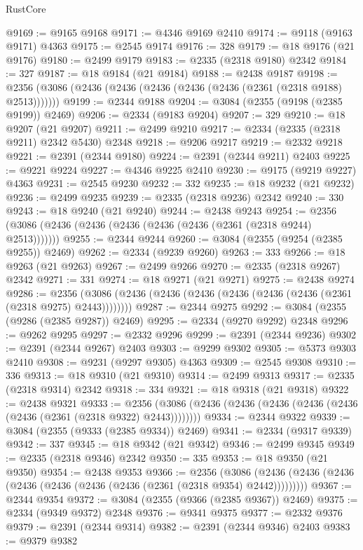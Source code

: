 \begin{lexlean}{RustCore}
\begin{coremodule}
@9169 := @9165 @9168
@9171 := @4346 @9169 @2410
@9174 := @9118 (@9163 @9171) @4363
@9175 := @2545 @9174
@9176 := 328
@9179 := @18 @9176 (@21 @9176)
@9180 := @2499 @9179
@9183 := @2335 (@2318 @9180) @2342
@9184 := 327
@9187 := @18 @9184 (@21 @9184)
@9188 := @2438 @9187
@9198 := @2356 (@3086 (@2436 (@2436 (@2436 (@2436 (@2436 (@2361 (@2318 @9188) @2513)))))))
@9199 := @2344 @9188
@9204 := @3084 (@2355 (@9198 (@2385 @9199)) @2469)
@9206 := @2334 (@9183 @9204)
@9207 := 329
@9210 := @18 @9207 (@21 @9207)
@9211 := @2499 @9210
@9217 := @2334 (@2335 (@2318 @9211) @2342 @5430) @2348
@9218 := @9206 @9217
@9219 := @2332 @9218
@9221 := @2391 (@2344 @9180)
@9224 := @2391 (@2344 @9211) @2403
@9225 := @9221 @9224
@9227 := @4346 @9225 @2410
@9230 := @9175 (@9219 @9227) @4363
@9231 := @2545 @9230
@9232 := 332
@9235 := @18 @9232 (@21 @9232)
@9236 := @2499 @9235
@9239 := @2335 (@2318 @9236) @2342
@9240 := 330
@9243 := @18 @9240 (@21 @9240)
@9244 := @2438 @9243
@9254 := @2356 (@3086 (@2436 (@2436 (@2436 (@2436 (@2436 (@2361 (@2318 @9244) @2513)))))))
@9255 := @2344 @9244
@9260 := @3084 (@2355 (@9254 (@2385 @9255)) @2469)
@9262 := @2334 (@9239 @9260)
@9263 := 333
@9266 := @18 @9263 (@21 @9263)
@9267 := @2499 @9266
@9270 := @2335 (@2318 @9267) @2342
@9271 := 331
@9274 := @18 @9271 (@21 @9271)
@9275 := @2438 @9274
@9286 := @2356 (@3086 (@2436 (@2436 (@2436 (@2436 (@2436 (@2436 (@2361 (@2318 @9275) @2443))))))))
@9287 := @2344 @9275
@9292 := @3084 (@2355 (@9286 (@2385 @9287)) @2469)
@9295 := @2334 (@9270 @9292) @2348
@9296 := @9262 @9295
@9297 := @2332 @9296
@9299 := @2391 (@2344 @9236)
@9302 := @2391 (@2344 @9267) @2403
@9303 := @9299 @9302
@9305 := @5373 @9303 @2410
@9308 := @9231 (@9297 @9305) @4363
@9309 := @2545 @9308
@9310 := 336
@9313 := @18 @9310 (@21 @9310)
@9314 := @2499 @9313
@9317 := @2335 (@2318 @9314) @2342
@9318 := 334
@9321 := @18 @9318 (@21 @9318)
@9322 := @2438 @9321
@9333 := @2356 (@3086 (@2436 (@2436 (@2436 (@2436 (@2436 (@2436 (@2361 (@2318 @9322) @2443))))))))
@9334 := @2344 @9322
@9339 := @3084 (@2355 (@9333 (@2385 @9334)) @2469)
@9341 := @2334 (@9317 @9339)
@9342 := 337
@9345 := @18 @9342 (@21 @9342)
@9346 := @2499 @9345
@9349 := @2335 (@2318 @9346) @2342
@9350 := 335
@9353 := @18 @9350 (@21 @9350)
@9354 := @2438 @9353
@9366 := @2356
    (@3086 (@2436 (@2436 (@2436 (@2436 (@2436 (@2436 (@2436 (@2361 (@2318 @9354) @2442)))))))))
@9367 := @2344 @9354
@9372 := @3084 (@2355 (@9366 (@2385 @9367)) @2469)
@9375 := @2334 (@9349 @9372) @2348
@9376 := @9341 @9375
@9377 := @2332 @9376
@9379 := @2391 (@2344 @9314)
@9382 := @2391 (@2344 @9346) @2403
@9383 := @9379 @9382

\end{coremodule}
\end{lexlean}
